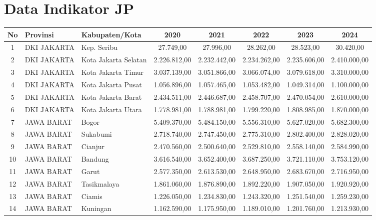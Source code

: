 \section*{Data Indikator JP}
\begin{spacing}{1.0}
\scriptsize
\setlength{\tabcolsep}{2pt}
\begin{longtable}{|c|p{2.2cm}|p{2.8cm}|c|c|c|c|c|}
\hline
\textbf{No} & \textbf{Provinsi} & \textbf{Kabupaten/Kota} & \textbf{2020} & \textbf{2021} & \textbf{2022} & \textbf{2023} & \textbf{2024} \\ \hline
\endhead
1 & DKI JAKARTA & Kep. Seribu & 27.749,00 & 27.996,00 & 28.262,00 & 28.523,00 & 30.420,00 \\ \hline
2 & DKI JAKARTA & Kota Jakarta Selatan & 2.226.812,00 & 2.232.442,00 & 2.234.262,00 & 2.235.606,00 & 2.410.000,00 \\ \hline
3 & DKI JAKARTA & Kota Jakarta Timur & 3.037.139,00 & 3.051.866,00 & 3.066.074,00 & 3.079.618,00 & 3.310.000,00 \\ \hline
4 & DKI JAKARTA & Kota Jakarta Pusat & 1.056.896,00 & 1.057.465,00 & 1.053.482,00 & 1.049.314,00 & 1.100.000,00 \\ \hline
5 & DKI JAKARTA & Kota Jakarta Barat & 2.434.511,00 & 2.446.687,00 & 2.458.707,00 & 2.470.054,00 & 2.610.000,00 \\ \hline
6 & DKI JAKARTA & Kota Jakarta Utara & 1.778.981,00 & 1.788.981,00 & 1.799.220,00 & 1.808.985,00 & 1.870.000,00 \\ \hline
7 & JAWA BARAT & Bogor & 5.409.370,00 & 5.484.150,00 & 5.556.310,00 & 5.627.020,00 & 5.682.300,00 \\ \hline
8 & JAWA BARAT & Sukabumi & 2.718.740,00 & 2.747.450,00 & 2.775.310,00 & 2.802.400,00 & 2.828.020,00 \\ \hline
9 & JAWA BARAT & Cianjur & 2.470.560,00 & 2.500.640,00 & 2.529.810,00 & 2.558.140,00 & 2.584.990,00 \\ \hline
10 & JAWA BARAT & Bandung & 3.616.540,00 & 3.652.400,00 & 3.687.250,00 & 3.721.110,00 & 3.753.120,00 \\ \hline
11 & JAWA BARAT & Garut & 2.577.350,00 & 2.613.530,00 & 2.648.950,00 & 2.683.670,00 & 2.716.950,00 \\ \hline
12 & JAWA BARAT & Tasikmalaya & 1.861.060,00 & 1.876.890,00 & 1.892.220,00 & 1.907.050,00 & 1.920.920,00 \\ \hline
13 & JAWA BARAT & Ciamis & 1.226.050,00 & 1.234.830,00 & 1.243.320,00 & 1.251.540,00 & 1.259.230,00 \\ \hline
14 & JAWA BARAT & Kuningan & 1.162.590,00 & 1.175.950,00 & 1.189.010,00 & 1.201.760,00 & 1.213.930,00 \\ \hline

\end{longtable}
\end{spacing}
